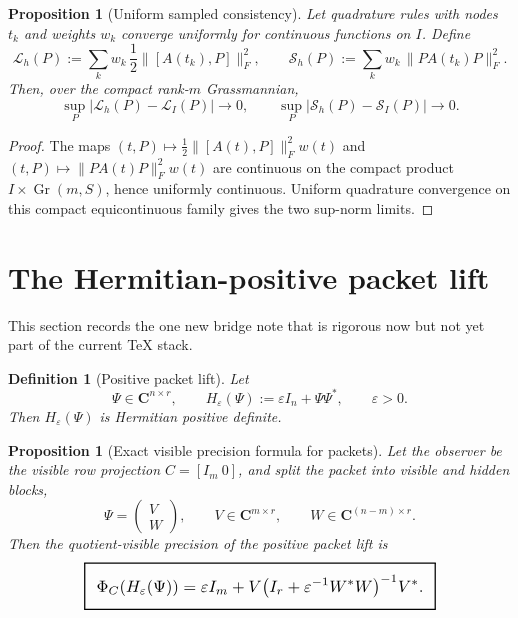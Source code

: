\documentclass[11pt,a4paper]{article}
\numberwithin{equation}{section}
\DeclareMathOperator{\Gr}{Gr}
\newcommand{\C}{\mathbf C}
\newcommand{\geomboxed}[1]{%
  \setlength{\fboxsep}{8pt}%
  \setlength{\fboxrule}{0.9pt}%
  \fbox{\scalebox{1.18}{$\displaystyle #1$}}%
}
\theoremstyle{thmcompact}
\newtheorem{proposition}[theorem]{Proposition}
\newtheorem{definition}[theorem]{Definition}
\theoremstyle{remark}
\begin{document}
\begin{proposition}[Uniform sampled consistency]
\label{prop:sampled-consistency}
Let quadrature rules with nodes $t_k$ and weights $w_k$ converge uniformly for continuous functions on $I$. Define
\[
\mathcal L_h(P):=
\sum_k w_k\,\frac12\|[A(t_k),P]\|_F^2,
\qquad
\mathcal S_h(P):=
\sum_k w_k\,\|PA(t_k)P\|_F^2.
\]
Then, over the compact rank-$m$ Grassmannian,
\[
\sup_P|\mathcal L_h(P)-\mathcal L_I(P)|\to0,
\qquad
\sup_P|\mathcal S_h(P)-\mathcal S_I(P)|\to0.
\]
\end{proposition}

\begin{proof}
The maps $(t,P)\mapsto \frac12\|[A(t),P]\|_F^2w(t)$ and $(t,P)\mapsto \|PA(t)P\|_F^2w(t)$ are continuous on the compact product $I\times \Gr(m,S)$, hence uniformly continuous. Uniform quadrature convergence on this compact equicontinuous family gives the two sup-norm limits.
\end{proof}

\section{The Hermitian-positive packet lift}

This section records the one new bridge note that is rigorous now but not yet part of the current TeX stack.

\begin{definition}[Positive packet lift]
Let
\[
\Psi\in \C^{n\times r},
\qquad
H_\varepsilon(\Psi):=\varepsilon I_n+\Psi\Psi^*,
\qquad
\varepsilon>0.
\]
Then $H_\varepsilon(\Psi)$ is Hermitian positive definite.
\end{definition}

\begin{proposition}[Exact visible precision formula for packets]
\label{prop:packet-formula}
Let the observer be the visible row projection $C=[I_m\ 0]$, and split the packet into visible and hidden blocks,
\[
\Psi=
\begin{pmatrix}
V\\
W
\end{pmatrix},
\qquad
V\in\C^{m\times r},
\qquad
W\in\C^{(n-m)\times r}.
\]
Then the quotient-visible precision of the positive packet lift is
\begin{equation}
\geomboxed{
\Phi_C(H_\varepsilon(\Psi))
=
\varepsilon I_m + V\bigl(I_r+\varepsilon^{-1}W^*W\bigr)^{-1}V^*.
}
\label{eq:packet-formula}
\end{equation}
\end{proposition}
\end{document}
